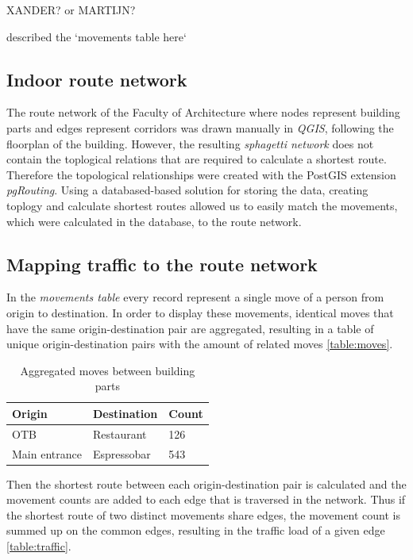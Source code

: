 XANDER? or MARTIJN?

described the `movements table here`

\subsection{Indoor route network}
The route network of the Faculty of Architecture where nodes represent building
parts and edges represent corridors was drawn manually in \textit{QGIS},
following the floorplan of the building. However, the resulting \textit{sphagetti network}
does not contain the toplogical relations that are required to calculate
a shortest route. Therefore the topological relationships were created with the
PostGIS extension \textit{pgRouting}. Using a databased-based solution for
storing the data, creating toplogy and calculate shortest routes allowed us to
easily match the movements, which were calculated in the database, to the route
network.

\subsection{Mapping traffic to the route network}
In the \textit{movements table} every record represent a single move of a person
from origin to destination. In order to display these movements, identical moves
that have the same origin-destination pair are aggregated, resulting in a table
of unique origin-destination pairs with the amount of related moves
\autoref{table:moves}.

\begin{table}[H]
\centering
\captionsetup{justification=centering}
\caption{Aggregated moves between building parts}
\label{table:moves}
\begin{tabular}{@{}lll@{}}
\toprule
Origin        & Destination & Count \\ \midrule
OTB           & Restaurant  & 126   \\
Main entrance & Espressobar & 543   \\ \bottomrule
\end{tabular}
\end{table}

Then the shortest route between each origin-destination pair is calculated and
the movement counts are added to each edge that is traversed in the network.
Thus if the shortest route of two distinct movements share edges, the movement
count is summed up on the common edges, resulting in the traffic load of a given
edge \autoref{table:traffic}.


